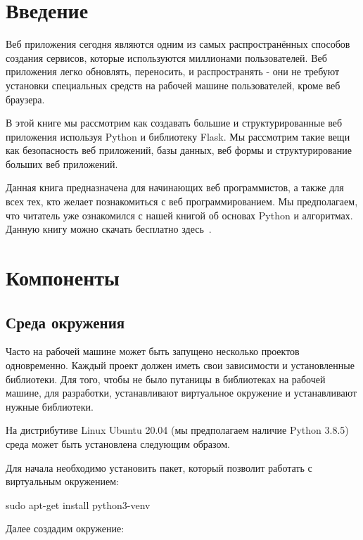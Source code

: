 \chapter*{Введение}
Веб приложения сегодня являются одним из самых распространённых
способов создания сервисов, которые используются миллионами 
пользователей. Веб приложения легко обновлять, переносить, и 
распространять - они не требуют установки специальных средств 
на рабочей машине пользователей, кроме веб браузера.

В этой книге мы рассмотрим как создавать большие и структурированные
веб приложения используя Python и библиотеку Flask. Мы рассмотрим
такие вещи как безопасность веб приложений, базы данных, веб формы
и структурирование больших веб приложений.

Данная книга предназначена для начинающих веб программистов, а также
для всех тех, кто желает познакомиться с веб программированием. Мы предполагаем,
что читатель уже ознакомился с нашей книгой об основах Python и алгоритмах.
Данную книгу можно скачать бесплатно здесь~\cite{kuptsov:python}.

\chapter{Компоненты}

\section{Среда окружения}

Часто на рабочей машине может быть запущено несколько проектов 
одновременно. Каждый проект должен иметь свои зависимости и установленные
библиотеки. Для того, чтобы не было путаницы в библиотеках
на рабочей машине, для разработки, устанавливают виртуальное окружение
и устанавливают нужные библиотеки.

На дистрибутиве Linux Ubuntu 20.04 (мы предполагаем наличие Python 3.8.5)
среда может быть установлена следующим образом.

Для начала необходимо установить пакет, который позволит работать с виртуальным
окружением:

\begin{python}
sudo apt-get install python3-venv
\end{python}

Далее создадим окружение:


